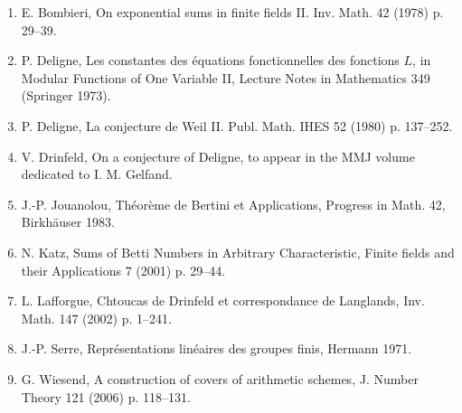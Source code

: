 \documentclass[10pt,a4paper]{article}
\theoremstyle{plain}
\theoremstyle{definition}
\begin{document}
\begin{enumerate}
\item[{[B]}] E. Bombieri, On exponential sums in finite fields II. Inv. Math. 42 (1978) p. 29--39.

\item[{[De1]}] P. Deligne, Les constantes des \'equations fonctionnelles des fonctions $L$, in Modular Functions of One Variable II, Lecture Notes in Mathematics 349 (Springer 1973).

\item[{[De2]}] P. Deligne, La conjecture de Weil II. Publ. Math. IHES 52 (1980) p. 137--252.

\item[{[Dr]}] V. Drinfeld, On a conjecture of Deligne, to appear in the MMJ volume dedicated to I. M. Gelfand.

\item[{[J]}] J.-P. Jouanolou, Th\'eor\`eme de Bertini et Applications, Progress in Math. 42, Birkh\"auser 1983.

\item[{[K]}] N. Katz, Sums of Betti Numbers in Arbitrary Characteristic, Finite fields and their Applications 7 (2001) p. 29--44.

\item[{[L]}] L. Lafforgue, Chtoucas de Drinfeld et correspondance de Langlands, Inv. Math. 147 (2002) p. 1--241.

\item[{[S]}] J.-P. Serre, Repr\'esentations lin\'eaires des groupes finis, Hermann 1971.

\item[{[W]}] G. Wiesend, A construction of covers of arithmetic schemes, J. Number Theory 121 (2006) p. 118--131.
\end{enumerate}
\end{document}
